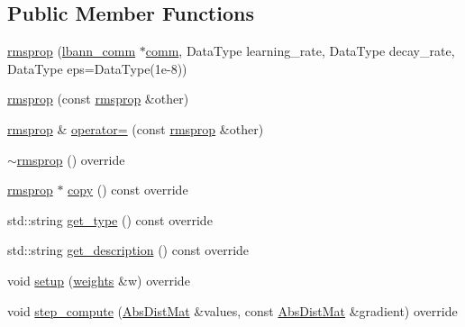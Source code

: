 \subsection*{Public Member Functions}
\begin{DoxyCompactItemize}
\item 
\hyperlink{classlbann_1_1rmsprop_af42c8e3336e72aac926e19c57b56e59f}{rmsprop} (\hyperlink{classlbann_1_1lbann__comm}{lbann\+\_\+comm} $\ast$\hyperlink{file__io_8cpp_ab048c6f9fcbcfaa57ce68b00263dbebe}{comm}, Data\+Type learning\+\_\+rate, Data\+Type decay\+\_\+rate, Data\+Type eps=Data\+Type(1e-\/8))
\item 
\hyperlink{classlbann_1_1rmsprop_af70a9a2c9ff67d0d39f14c6e283abd95}{rmsprop} (const \hyperlink{classlbann_1_1rmsprop}{rmsprop} \&other)
\item 
\hyperlink{classlbann_1_1rmsprop}{rmsprop} \& \hyperlink{classlbann_1_1rmsprop_a3c7eb1fb105c7be762b97e4f947a2b94}{operator=} (const \hyperlink{classlbann_1_1rmsprop}{rmsprop} \&other)
\item 
\hyperlink{classlbann_1_1rmsprop_ae837f3c0e5b49f8baa42cc9c864259fc}{$\sim$rmsprop} () override
\item 
\hyperlink{classlbann_1_1rmsprop}{rmsprop} $\ast$ \hyperlink{classlbann_1_1rmsprop_a1493737d356809ad5c94f77051de8814}{copy} () const override
\item 
std\+::string \hyperlink{classlbann_1_1rmsprop_aa4299a19c0ab81a41ccebb9486f106b6}{get\+\_\+type} () const override
\item 
std\+::string \hyperlink{classlbann_1_1rmsprop_a4526482bf60f7f3fc3f60ff70b38cdb7}{get\+\_\+description} () const override
\item 
void \hyperlink{classlbann_1_1rmsprop_a8f6111a36f9ad592d14e13b64a0f228f}{setup} (\hyperlink{classlbann_1_1weights}{weights} \&w) override
\item 
void \hyperlink{classlbann_1_1rmsprop_a600e4b332299a6aaa36d0b7ff458e3f3}{step\+\_\+compute} (\hyperlink{base_8hpp_a9a697a504ae84010e7439ffec862b470}{Abs\+Dist\+Mat} \&values, const \hyperlink{base_8hpp_a9a697a504ae84010e7439ffec862b470}{Abs\+Dist\+Mat} \&gradient) override
\end{DoxyCompactItemize}
